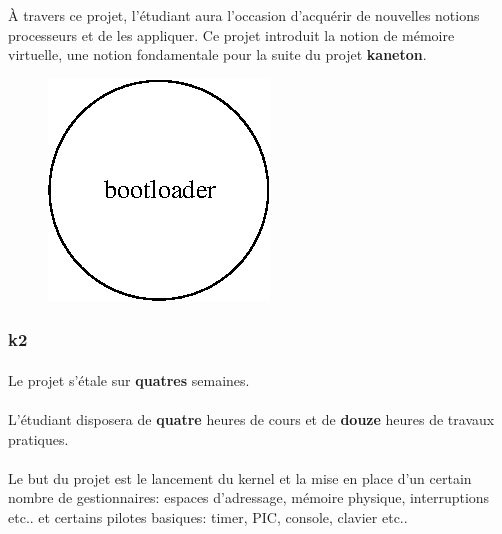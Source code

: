 \documentclass[10pt,a4wide]{article}
\begin{document}
\`A travers ce projet, l'\'etudiant aura l'occasion d'acqu\'erir de nouvelles
notions processeurs et de les appliquer. Ce projet introduit la notion
de m\'emoire virtuelle, une notion fondamentale pour la suite du projet
\textbf{kaneton}.

\vspace{5cm}

\begin{figure}[h]
\centerline{\includegraphics{figures/k1.eps}}
\end{figure}

\newpage

\subsubsection{k2}

\paragraph{}

Le projet s'\'etale sur \textbf{quatres} semaines.

\paragraph{}

L'\'etudiant disposera de \textbf{quatre} heures de cours et de \textbf{douze}
heures de travaux pratiques.

\paragraph{}

Le but du projet est le lancement du kernel et la mise en place d'un certain
nombre de gestionnaires: espaces d'adressage, m\'emoire physique,
interruptions etc.. et certains pilotes basiques: timer, PIC, console,
clavier etc..

\paragraph{}
\end{document}
